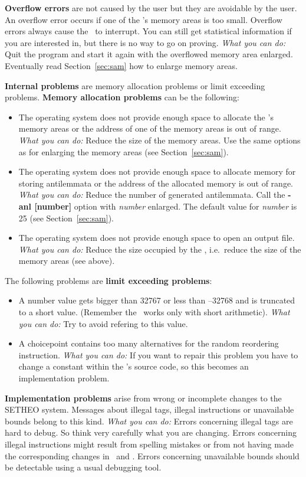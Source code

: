 {\bf Overflow errors} are not caused by the user but they are
avoidable by the 
user. An overflow error occurs if one of the \SAM's memory areas is
too small. Overflow errors always cause the \SAM\ to interrupt. You
can still get statistical information if you are interested in, but
there is no way to go on proving. 
{\it What you can do:\/} Quit the program and start it again with the
overflowed memory area enlarged. Eventually read Section~\ref{sec:sam}
how to enlarge memory areas.

{\bf Internal problems} are memory allocation problems or limit
exceeding problems. {\bf Memory allocation problems} can be the
following: 
\begin{itemize}
\item{The operating system does not provide enough space to allocate
      the \SAM's memory areas or the address of one of the memory
      areas is out of range. {\it What you can do:\/} Reduce the 
      size of the memory areas. Use the same options as for enlarging
      the memory areas (see Section~\ref{sec:sam}).}
\item{The operating system does not provide enough space to allocate
      memory for storing antilemmata or the address of the allocated
      memory is out of range. {\it What you can do:\/} Reduce
      the number of generated antilemmata. Call the {\bf -anl
      [number]} option with {\it number\/} enlarged. The default value
      for {\it number\/} is 25 (see Section~\ref{sec:sam}).}
\item{The operating system does not provide enough space to open an
      output file. {\it What you can do:\/} Reduce the size occupied
      by the \SAM, i.e.\ reduce the size of the memory areas (see above).}
\end{itemize}
The following problems are {\bf limit exceeding problems}:
\begin{itemize}
\item{A number value gets bigger than 32767 or less than --32768 and is
      truncated to a short value.
      (Remember the \SAM\ works only with short arithmetic). {\it What
      you can do:\/} Try to avoid refering to this value.}
\item{A choicepoint contains too many alternatives for the random
      reordering instruction. {\it What you can do:\/} If you want to
      repair this problem you have to change a constant within the
      \SAM's source code, so this becomes an implementation problem.}
\end{itemize}

{\bf Implementation problems} arise from wrong or incomplete
changes to the SETHEO system. Messages about illegal tags, illegal
instructions or unavailable bounds belong to this kind. 
{\it What you can do:} Errors concerning illegal tags are hard to
debug. So think very carefully what you are changing. Errors
concerning illegal instructions might result from spelling mistakes or
from not having made the corresponding changes in \inw\ and \wasm. Errors
concerning unavailable bounds should be detectable using a usual
debugging tool.
